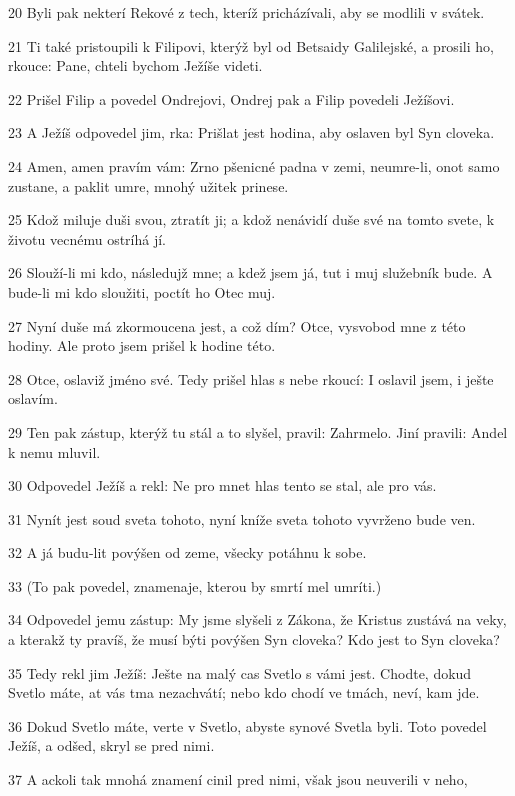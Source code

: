 \par 20 Byli pak nekterí Rekové z tech, kteríž pricházívali, aby se modlili v svátek.
\par 21 Ti také pristoupili k Filipovi, kterýž byl od Betsaidy Galilejské, a prosili ho, rkouce: Pane, chteli bychom Ježíše videti.
\par 22 Prišel Filip a povedel Ondrejovi, Ondrej pak a Filip povedeli Ježíšovi.
\par 23 A Ježíš odpovedel jim, rka: Prišlat jest hodina, aby oslaven byl Syn cloveka.
\par 24 Amen, amen pravím vám: Zrno pšenicné padna v zemi, neumre-li, onot samo zustane, a paklit umre, mnohý užitek prinese.
\par 25 Kdož miluje duši svou, ztratít ji; a kdož nenávidí duše své na tomto svete, k životu vecnému ostríhá jí.
\par 26 Slouží-li mi kdo, následujž mne; a kdež jsem já, tut i muj služebník bude. A bude-li mi kdo sloužiti, poctít ho Otec muj.
\par 27 Nyní duše má zkormoucena jest, a což dím? Otce, vysvobod mne z této hodiny. Ale proto jsem prišel k hodine této.
\par 28 Otce, oslaviž jméno své. Tedy prišel hlas s nebe rkoucí: I oslavil jsem, i ješte oslavím.
\par 29 Ten pak zástup, kterýž tu stál a to slyšel, pravil: Zahrmelo. Jiní pravili: Andel k nemu mluvil.
\par 30 Odpovedel Ježíš a rekl: Ne pro mnet hlas tento se stal, ale pro vás.
\par 31 Nynít jest soud sveta tohoto, nyní kníže sveta tohoto vyvrženo bude ven.
\par 32 A já budu-lit povýšen od zeme, všecky potáhnu k sobe.
\par 33 (To pak povedel, znamenaje, kterou by smrtí mel umríti.)
\par 34 Odpovedel jemu zástup: My jsme slyšeli z Zákona, že Kristus zustává na veky, a kterakž ty pravíš, že musí býti povýšen Syn cloveka? Kdo jest to Syn cloveka?
\par 35 Tedy rekl jim Ježíš: Ješte na malý cas Svetlo s vámi jest. Chodte, dokud Svetlo máte, at vás tma nezachvátí; nebo kdo chodí ve tmách, neví, kam jde.
\par 36 Dokud Svetlo máte, verte v Svetlo, abyste synové Svetla byli. Toto povedel Ježíš, a odšed, skryl se pred nimi.
\par 37 A ackoli tak mnohá znamení cinil pred nimi, však jsou neuverili v neho,
